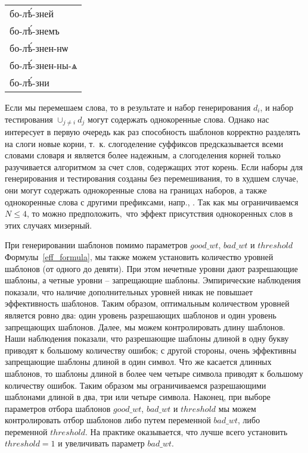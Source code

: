 \documentclass[12pt,a4paper,oneside]{extarticle}
\begin{document}
\begin{center}
\begin{churchslavonic}
\begin{tabular}{l}
бо-лѣ́-зней \\
бо-лѣ́-знемъ \\
бо-лѣ́-знен-нѡ \\
бо-лѣ́-знен-ны-ѧ \\
бо-лѣ́-зни \\
\end{tabular}
\end{churchslavonic}
\end{center}

\noindent Если мы перемешаем слова, то в результате и набор генерирования $d_i$, и набор тестирования $\cup_{j \neq i} d_j$ могут содержать однокоренные слова. Однако нас интересует в первую очередь как раз способность шаблонов корректно разделять на слоги новые корни, т.~к. слогоделение суффиксов предсказывается всеми словами словаря и является более надежным, а слогоделения корней только разучивается алгоритмом за счет слов, содержащих этот корень. Если наборы для генерирования и тестирования созданы без перемешивания, то в худшем случае, они могут содержать однокоренные слова на границах наборов, а также однокоренные слова с другими префиксами, напр., . Так как мы ограничиваемся $N \leq 4$, то можно предположить, что эффект присутствия однокоренных слов в этих случаях мизерный.

При генерировании шаблонов помимо параметров $good\_wt$, $bad\_wt$ и $threshold$ Формулы~\ref{eff_formula}, мы также можем установить количество уровней шаблонов (от одного до девяти). При этом нечетные уровни дают разрешающие шаблоны, а четные уровни -- запрещающие шаблоны. Эмпирические наблюдения показали, что наличие дополнительных уровней никак не повышает эффективность шаблонов. Таким образом, оптимальным количеством уровней является ровно два: один уровень разрешающих шаблонов и один уровень запрещающих шаблонов. Далее, мы можем контролировать длину шаблонов. Наши наблюдения показали, что разрешающие шаблоны длиной в одну букву приводят к большому количеству ошибок; с другой стороны, очень эффективны запрещающие шаблоны длиной в один символ. Что же касается длинных шаблонов, то шаблоны длиной в более чем четыре символа приводят к большому количеству ошибок. Таким образом мы ограничиваемся разрешающими шаблонами длиной в два, три или четыре символа. Наконец, при выборе параметров отбора шаблонов $good\_wt$, $bad\_wt$ и $threshold$ мы можем контролировать отбор шаблонов либо путем переменной $bad\_wt$, либо переменной $threshold$. На практике оказывается, что лучше всего установить $threshold = 1$ и увеличивать параметр $bad\_wt$.
\end{document}
